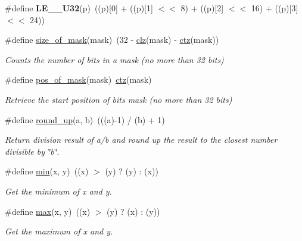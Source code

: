 \begin{DoxyCompactItemize}
\mbox{\label{group__doc__driver__hal__utils__macro_gac21ac7b0f38e7b8138886c362d9cc663}} 
\#define {\bfseries L\+E\+\_\+\_\+\+U32}(p)~((p)\mbox{[}0\mbox{]} + ((p)\mbox{[}1\mbox{]} $<$$<$ 8) + ((p)\mbox{[}2\mbox{]} $<$$<$ 16) + ((p)\mbox{[}3\mbox{]} $<$$<$ 24))
\item 
\#define \hyperlink{group__doc__driver__hal__utils__macro_gacb24f277663a5c87482fbcdbef5f2bd2}{size\+\_\+of\+\_\+mask}(mask)~(32 -\/ \hyperlink{group__doc__driver__hal__utils__macro_ga004f88903a09b9c23017e697eaf5a845}{clz}(mask) -\/ \hyperlink{group__doc__driver__hal__utils__macro_gab069bfec305db5213465d3b689836404}{ctz}(mask))
\begin{DoxyCompactList}\small\item\em Counts the number of bits in a mask (no more than 32 bits) \end{DoxyCompactList}\item 
\#define \hyperlink{group__doc__driver__hal__utils__macro_ga6e6ec9c159cae4680d073d707063fa0e}{pos\+\_\+of\+\_\+mask}(mask)~\hyperlink{group__doc__driver__hal__utils__macro_gab069bfec305db5213465d3b689836404}{ctz}(mask)
\begin{DoxyCompactList}\small\item\em Retrieve the start position of bits mask (no more than 32 bits) \end{DoxyCompactList}\item 
\mbox{\label{group__doc__driver__hal__utils__macro_gab4181d52c8a5083a8f30e3063893f3da}} 
\#define \hyperlink{group__doc__driver__hal__utils__macro_gab4181d52c8a5083a8f30e3063893f3da}{round\+\_\+up}(a,  b)~(((a)-\/1) / (b) + 1)
\begin{DoxyCompactList}\small\item\em Return division result of a/b and round up the result to the closest number divisible by \char`\"{}b\char`\"{}. \end{DoxyCompactList}\item 
\mbox{\label{group__doc__driver__hal__utils__macro_gabb702d8b501669a23aa0ab3b281b9384}} 
\#define \hyperlink{group__doc__driver__hal__utils__macro_gabb702d8b501669a23aa0ab3b281b9384}{min}(x,  y)~((x) $>$ (y) ? (y) \+: (x))
\begin{DoxyCompactList}\small\item\em Get the minimum of x and y. \end{DoxyCompactList}\item 
\mbox{\label{group__doc__driver__hal__utils__macro_gac39d9cef6a5e030ba8d9e11121054268}} 
\#define \hyperlink{group__doc__driver__hal__utils__macro_gac39d9cef6a5e030ba8d9e11121054268}{max}(x,  y)~((x) $>$ (y) ? (x) \+: (y))
\begin{DoxyCompactList}\small\item\em Get the maximum of x and y. \end{DoxyCompactList}\end{DoxyCompactItemize}
